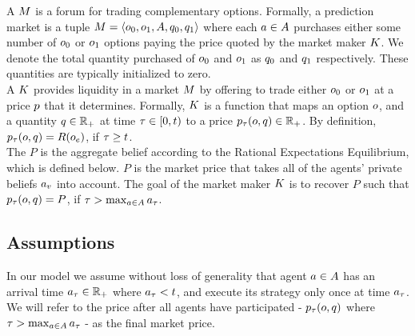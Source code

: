A  $M$ is a forum for trading complementary options. 
Formally, a prediction market is a tuple $M = 
\left<o_0, o_1, A, {q_0}, {q_1}\right>$ where each  
$a\in A$ purchases 
either some number of $o_0$ or $o_1$ options paying the price quoted by the 
market maker $K$. We denote the total quantity purchased of $o_0$ and $o_1$
as ${q_0}$ and ${q_1}$ respectively. These quantities are typically initialized to zero. \\

A  $K$ provides liquidity in a market $M$ by
offering to trade either $o_0$ or $o_1$ at a price $p$ that it determines. 
Formally, $K$ is a function 
that maps an option $o$, 
and a quantity $q\in\mathbb{R}_+$ at time $\tau \in [0,t)$ 
to a price $p_{\tau}(o,q) \in \mathbb{R}_+$. 
By definition, $p_{\tau}(o,q) = R(o_e)$, if 
$\tau \ge t$. \\

The  $P$ is the aggregate belief according to the Rational Expectations Equilibrium, which is defined below. $P$ is the market price that takes all of the agents' private beliefs $a_v$ into account. The goal of the market maker $K$ is to recover $P$ such that $p_{\tau}(o,q) = P$, if $\tau > \max_{a \in A} a_\tau$. \\


\subsection{Assumptions}

In our model we assume without loss of generality that agent $a \in A$ has an arrival time 
$a_\tau \in \mathbb{R}_+$ where $a_\tau < t$, 
and execute its strategy only once at time $a_\tau$. We will refer to the price after all agents have participated - $p_{\tau}(o,q)$ where $\tau > \max_{a \in A} a_\tau$ - as the final market price.\\

